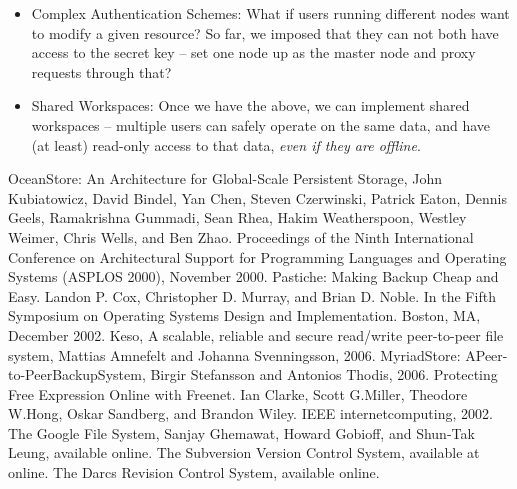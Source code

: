 \documentclass[11pt]{article}
\begin{document}
\begin{mainmatter}
\begin{itemize}
\item Complex Authentication Schemes:
What if users running different nodes want to modify a given resource? So far, we imposed that they can not both have access to the secret key -- set one node up as the master node and proxy requests through that?

\item Shared Workspaces:
Once we have the above, we can implement shared workspaces -- multiple users can safely operate on the same data, and have (at least) read-only access to that data, \emph{even if they are offline}.
\end{itemize}

\end{mainmatter}

\begin{thebibliography}{99}
 OceanStore: An Architecture for Global-Scale Persistent Storage, John Kubiatowicz, David Bindel, Yan Chen, Steven Czerwinski, Patrick Eaton, Dennis Geels, Ramakrishna Gummadi, Sean Rhea, Hakim Weatherspoon, Westley Weimer, Chris Wells, and Ben Zhao. Proceedings of the Ninth International Conference on Architectural Support for Programming Languages and Operating Systems (ASPLOS 2000), November 2000.
 Pastiche: Making Backup Cheap and Easy. Landon P. Cox, Christopher D. Murray, and Brian D. Noble.  In the Fifth Symposium on Operating Systems Design and Implementation. Boston, MA, December 2002.
 Keso, A scalable, reliable and secure read/write peer-to-peer file system, Mattias Amnefelt and
Johanna Svenningsson, 2006.
 MyriadStore: APeer-to-PeerBackupSystem, Birgir Stefansson and Antonios Thodis, 2006. 
 Protecting Free Expression Online with Freenet. Ian Clarke, Scott G.Miller, Theodore W.Hong, Oskar Sandberg, and Brandon Wiley. IEEE internetcomputing,  2002.
 The Google File System, Sanjay Ghemawat, Howard Gobioff, and Shun-Tak Leung, available online.
 The Subversion Version Control System, available at online.
 The Darcs Revision Control System, available online.
\end{thebibliography}
\end{document}
